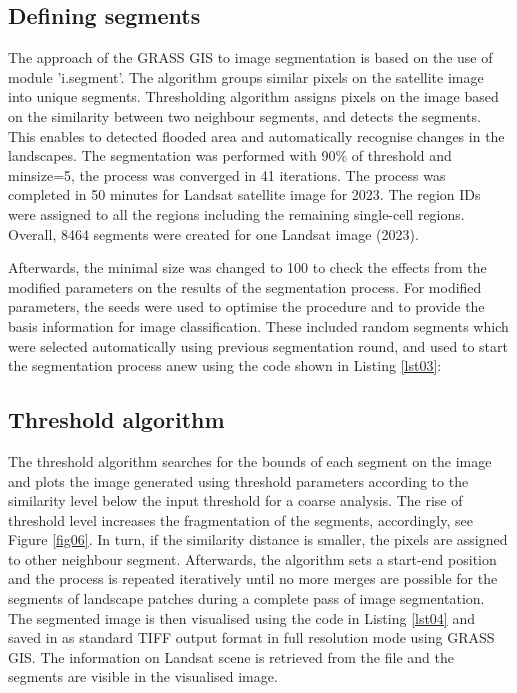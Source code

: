 \documentclass[analytics,article,submit,pdftex,moreauthors]{Definitions/mdpi}
\begin{document}
\subsection{Defining segments}
The approach of the GRASS GIS to image segmentation is based on the use of module 'i.segment'. The algorithm groups similar pixels on the satellite image into unique segments. Thresholding algorithm assigns pixels on the image based on the similarity between two neighbour segments, and detects the segments. This enables to detected flooded area and automatically recognise changes in the landscapes. The segmentation was performed with 90\% of threshold and minsize=5, the process was converged in 41 iterations. The process was completed in 50 minutes for Landsat satellite image for 2023. The region IDs were assigned to all the regions including the remaining single-cell regions. Overall, 8464 segments were created for one Landsat image (2023). 

Afterwards, the minimal size was changed to 100 to check the effects from the modified parameters on the results of the segmentation process. For modified parameters, the seeds were used to optimise the procedure and to provide the basis information for image classification. These included random segments which were selected automatically using previous segmentation round, and used to start the segmentation process anew using the code shown in Listing \ref{lst03}:

\subsection{Threshold algorithm}
The threshold algorithm searches for the bounds of each segment on the image and plots the image generated using threshold parameters according to the similarity level below the input threshold for a coarse analysis. The rise of  threshold level increases the fragmentation of the segments, accordingly, see Figure \ref{fig06}. In turn, if the similarity distance is smaller, the pixels are assigned to other neighbour segment. Afterwards, the algorithm sets a start-end position and the process is repeated iteratively until no more merges are possible for the segments of landscape patches during a complete pass of image segmentation. The segmented image is then visualised using the code in Listing \ref{lst04} and saved in as standard TIFF output format in full resolution mode using GRASS GIS. The information on Landsat scene is retrieved from the file and the segments are visible in the visualised image.
\end{document}

